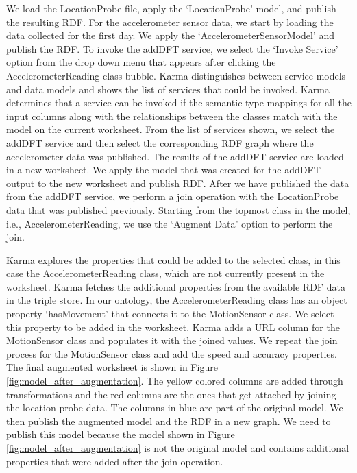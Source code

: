 We load the LocationProbe file, apply the `LocationProbe' model, and publish the resulting RDF. For the accelerometer sensor data, we start by loading the data collected for the first day. We apply the `AccelerometerSensorModel' and publish the RDF. To invoke the addDFT service, we select the `Invoke Service' option from the drop down menu that appears after clicking the AccelerometerReading class bubble. Karma distinguishes between service models and data models and shows the list of services that could be invoked. Karma determines that a service can be invoked if the semantic type mappings for all the input columns along with the relationships between the classes match with the model on the current worksheet. From the list of services shown, we select the addDFT service and then select the corresponding RDF graph where the accelerometer data was published. The results of the addDFT service are loaded in a new worksheet. We apply the model that was created for the addDFT output to the new worksheet and publish RDF. After we have published the data from the addDFT service, we perform a join operation with the LocationProbe data that was published previously. Starting from the topmost class in the model, i.e., AccelerometerReading, we use the `Augment Data' option to perform the join.

Karma explores the properties that could be added to the selected class, in this case the AccelerometerReading class, which are not currently present in the worksheet. Karma fetches the additional properties from the available RDF data in the triple store. In our ontology, the AccelerometerReading class has an object property `hasMovement' that connects it to the MotionSensor class. We select this property to be added in the worksheet. Karma adds a URL column for the MotionSensor class and populates it with the joined values. We repeat the join process for the MotionSensor class and add the speed and accuracy properties. The final augmented worksheet is shown in Figure \ref{fig:model_after_augmentation}. The yellow colored columns are added through transformations and the red columns are the ones that get attached by joining the location probe data. The columns in blue are part of the original model. We then publish the augmented model and the RDF in a new graph. We need to publish this model because the model shown in Figure \ref{fig:model_after_augmentation} is not the original model and contains additional properties that were added after the join operation. 

